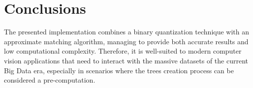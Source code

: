 \documentclass[a4paper, 11pt, oneside]{article}
\begin{document}
\section*{Conclusions}
The presented implementation combines a binary quantization technique with an approximate matching algorithm, managing to provide both accurate results and low computational complexity. Therefore, it is well-suited to modern computer vision applications that need to interact with the massive datasets of the current Big Data era, especially in scenarios where the trees creation process can be considered a pre-computation.



\end{document}
